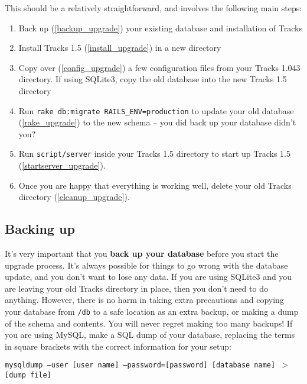 \documentclass[10pt,twoside]{memoir}
\begin{document}
This should be a relatively straightforward, and involves the following main steps:


\begin{enumerate}


\item Back up (\autoref{backup_upgrade}) your existing database and installation of Tracks

\item Install Tracks 1.5 (\autoref{install_upgrade}) in a new directory

\item Copy over (\autoref{config_upgrade}) a few configuration files from your Tracks 1.043 directory. If using SQLite3, copy the old database into the new Tracks 1.5 directory

\item Run \texttt{rake db:migrate RAILS\_ENV=production} to update your old database (\autoref{rake_upgrade}) to the new schema -- you did back up your database didn't you?

\item Run \texttt{script/server} inside your Tracks 1.5 directory to start up Tracks 1.5 (\autoref{startserver_upgrade}).

\item Once you are happy that everything is working well, delete your old Tracks directory (\autoref{cleanup_upgrade}).
\end{enumerate}

\subsection{Backing up}
\label{backup_upgrade}

It's very important that you \textbf{back up your database} before you start the upgrade process. It's always possible for things to go wrong with the database update, and you don't want to lose any data. If you are using SQLite3 and you are leaving your old Tracks directory in place, then you don't need to do anything. However, there is no harm in taking extra precautions and copying your database from \texttt{/db} to a safe location as an extra backup, or making a dump of the schema and contents. You will never regret making too many backups! If you are using MySQL, make a SQL dump of your database, replacing the terms in square brackets with the correct information for your setup:


\texttt{mysqldump ---user [user name] ---password=[password] [database name] $>$ [dump file]}
\end{document}
